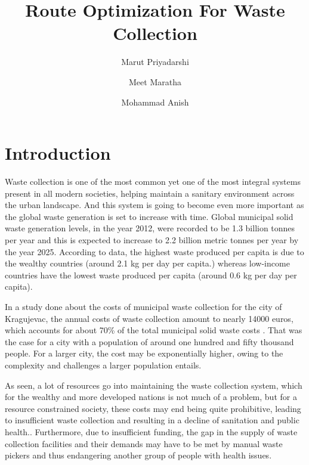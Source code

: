 \documentclass[12pt]{article}
\begin{document}

\title{Route Optimization For Waste Collection\\}

\author[1]{Marut Priyadarshi}
\author[2]{Meet Maratha}
\author[3]{Mohammad Anish}

\maketitle

\section{Introduction}
Waste collection is one of the most common yet one of the most integral systems present in all modern societies, helping maintain a sanitary environment across the urban landscape. And this system is going to become even more important as the global waste generation is set to increase with time. Global municipal solid waste generation levels, in the year 2012, were recorded to be 1.3 billion tonnes per year and this is expected to increase to 2.2 billion metric tonnes per year by the year 2025. According to data, the highest waste produced per capita is due to the wealthy countries (around 2.1 kg per day per capita.) whereas low-income countries have the lowest waste produced per capita (around 0.6 kg per day per capita).\cite{hoornweg2012waste}

In a study done about the costs of municipal waste collection for the city of Kragujevac, the annual costs of waste collection amount to nearly 14000 euros, which accounts for about 70\% of the total municipal solid waste costs \cite{boskovic2016calculating}. That was the case for a city with a population of around one hundred and fifty thousand people. For a larger city, the cost may be exponentially higher, owing to the complexity and challenges a larger population entails.

As seen, a lot of resources go into maintaining the waste collection system, which for the wealthy and more developed nations is not much of a problem, but for a resource constrained society, these costs may end being quite prohibitive, leading to insufficient waste collection and resulting in a decline of sanitation and public health.\cite{hamer2003solid}. Furthermore, due to insufficient funding, the gap in the supply of waste collection facilities and their demands may have to be met by manual waste pickers and thus endangering another group of people with health issues.\cite{gutberlet2017household}
\end{document}

